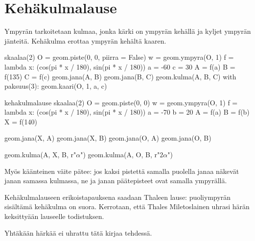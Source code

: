\section*{Kehäkulmalause}

Ympyrän  tarkoitetaan kulmaa, jonka kärki on ympyrän kehällä ja kyljet ympyrän jänteitä. Kehäkulma erottaa ympyrän kehältä kaaren.
\begin{center}
\begin{kuva}
	skaalaa(2)
	O = geom.piste(0, 0, piirra = False)
	w = geom.ympyra(O, 1)
	f = lambda x: (cos(pi * x / 180), sin(pi * x / 180))
	a = -60
	c = 30
	A = f(a)
	B = f(135)
	C = f(c)
	geom.jana(A, B)
	geom.jana(B, C)
	geom.kulma(A, B, C)
	with paksuus(3):
		geom.kaari(O, 1, a, c)
\end{kuva}
\end{center}

\begin{luoKuva}{kehakulmalause}
	skaalaa(2)
	O = geom.piste(0, 0)
	w = geom.ympyra(O, 1)
	f = lambda x: (cos(pi * x / 180), sin(pi * x / 180))
	a = -70
	b = 20
	A = f(a)
	B = f(b)
	X = f(140)
	
	geom.jana(X, A)
	geom.jana(X, B)
	geom.jana(O, A)
	geom.jana(O, B)
	
	geom.kulma(A, X, B, r"$\alpha$")
	geom.kulma(A, O, B, r"$2\alpha$")
\end{luoKuva}


Myös käänteinen väite pätee: jos kaksi pistettä samalla puolella janaa näkevät janan samassa kulmassa, ne ja janan päätepisteet ovat samalla ympyrällä.

Kehäkulmalauseen erikoistapauksena saadaan Thaleen lause: puoliympyrän sisältämä kehäkulma on suora. Kerrotaan, että Thales Miletoslainen uhrasi härän keksittyään lauseelle todistuksen.

Yhtäkään härkää ei uhrattu tätä kirjaa tehdessä.
